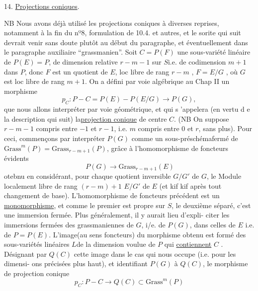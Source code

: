 
14. \uline{Projections coniques}.

NB Nous avons déjà utilisé les projections coniques à diverses
\placedmargin{$\|$}reprises, notamment à la fin du nº8, formulation de 10.4. et autres, et
le sorite qui suit devrait venir sans doute plutôt au début du paragraphe,
et éventuellement dans le paragraphe auxiliaire ``grassmanien''.
Soit $C = P(F)$ une sous-variété linéaire de $P(E)=P$, de dimension
relative $r-m-1$  sur $S$i.e. de codimension $m+1$ dans $P$, donc $F$ est un quotient de $E$, loc libre de
rang $r-m$ , $F=E/G$ , où $G$ est loc libre de rang $m+1$. On a défini
par voie algébrique au Chap II un morphisme
\[ p_C : P - C = P(E) - P(E/G) \longrightarrow P(G) , \]
que nous allons interpréter par voie géométrique, et qui s 'appelera
(en vertu d e la description qui suit) la\uline{projection conique} de centre $C$.
(NB On suppose $r-m-1$ compris entre $-1$ et $r-1$, i.e. $m$ compris entre $0$
et $r$, sans plus). Pour ceci, commençons par interpréter  $P(G)$
comme un sous-préschémafermé de $\mathrm{Grass}^m(P)= \mathrm{Grass}_{r-m+1}(P)$, grâce à l'homomorphisme
de foncteurs évidents
\[ \ P(G) \longrightarrow \mathrm{Grass}_{r-m+1}(E) \]
otebnu en considérant, pour chaque quotient inversible $G/G'$ de $G$, le
Module localement libre de rang $(r-m)+1$ $E/G'$ de $E$ (et kif kif après
tout changement de base). L'homomorphisme de foncteurs précédent est un
\uline{monomorphisme}, et comme le premier est propre sur $S$, le deuxième séparé,
c'est une immersion fermée. Plus généralement, il y aurait lieu d'expli-%
citer les immersions fermées des grassmaniennes de $G$, i/e. de $P(G)$,
dans celles de $E$ i.e. de $P=P(E)$.  L'image(au sens foncteurs) du morphisme obtenu est formé des
sous-variétés linéaires  $L$de la dimension voulue de $P$ qui \uline{contiennent} $C$ . Désignant
par $Q(C)$ cette image dans le cas qui nous occupe (i.e. pour les dimensi-%
ons précisées plus haut), et identifiant $P(G)$ à $Q(C)$, le morphisme
de projection conique
\[ p_C : P - C \longrightarrow Q(C) \subset \mathrm{Grass}^m(P) \]

